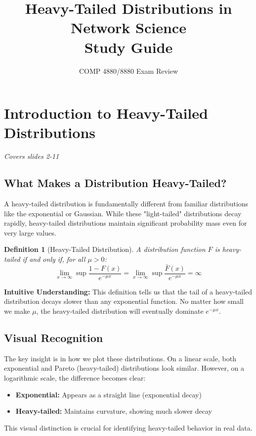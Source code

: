 \documentclass[11pt]{article}
\title{\textbf{Heavy-Tailed Distributions in Network Science\\Study Guide}}
\author{COMP 4880/8880 Exam Review}
\date{}
\newtheorem{definition}{Definition}
\begin{document}
\maketitle

\section{Introduction to Heavy-Tailed Distributions}
\textit{Covers slides 2-11}

\subsection{What Makes a Distribution Heavy-Tailed?}

A heavy-tailed distribution is fundamentally different from familiar distributions like the exponential or Gaussian. While these "light-tailed" distributions decay rapidly, heavy-tailed distributions maintain significant probability mass even for very large values.

\begin{definition}[Heavy-Tailed Distribution]
A distribution function $F$ is heavy-tailed if and only if, for all $\mu > 0$:
$$\lim_{x \to \infty} \sup \frac{1-F(x)}{e^{-\mu x}} = \lim_{x \to \infty} \sup \frac{\bar{F}(x)}{e^{-\mu x}} = \infty$$
\end{definition}

\textbf{Intuitive Understanding:} This definition tells us that the tail of a heavy-tailed distribution decays slower than any exponential function. No matter how small we make $\mu$, the heavy-tailed distribution will eventually dominate $e^{-\mu x}$.

\subsection{Visual Recognition}

The key insight is in how we plot these distributions. On a linear scale, both exponential and Pareto (heavy-tailed) distributions look similar. However, on a logarithmic scale, the difference becomes clear:
\begin{itemize}
\item \textbf{Exponential:} Appears as a straight line (exponential decay)
\item \textbf{Heavy-tailed:} Maintains curvature, showing much slower decay
\end{itemize}

This visual distinction is crucial for identifying heavy-tailed behavior in real data.
\end{document}
